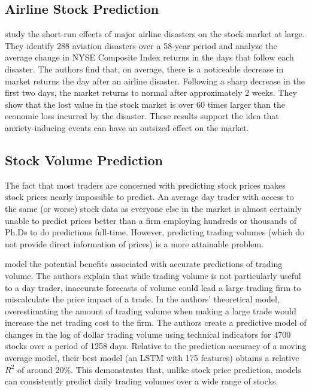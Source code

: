 \documentclass[12pt]{article}
\begin{document}
\subsection{Airline Stock Prediction}
\cite{kaplanski2010sentiment} study the short-run effects of major airline disasters on the stock market at large. They identify 288 aviation disasters over a 58-year period and analyze the average change in NYSE Composite Index returns in the days that follow each disaster. The authors find that, on average, there is a noticeable decrease in market returns the day after an airline disaster. Following a sharp decrease in the first two days, the market returns to normal after approximately 2 weeks. They show that the lost value in the stock market is over 60 times larger than the economic loss incurred by the disaster. These results support the idea that anxiety-inducing events can have an outsized effect on the market.

\subsection{Stock Volume Prediction}
The fact that most traders are concerned with predicting stock prices makes stock prices nearly impossible to predict. An average day trader with access to the same (or worse) stock data as everyone else in the market is almost certainly unable to predict prices better than a firm employing hundreds or thousands of Ph.Ds to do predictions full-time. However, predicting trading volumes (which do not provide direct information of prices) is a more attainable problem.

\cite{goyenko2024trading} model the potential benefits associated with accurate predictions of trading volume. The authors explain that while trading volume is not particularly useful to a day trader, inaccurate forecasts of volume could lead a large trading firm to miscalculate the price impact of a trade. In the authors' theoretical model, overestimating the amount of trading volume when making a large trade would increase the net trading cost to the firm. The authors create a predictive model of changes in the log of dollar trading volume using technical indicators for 4700 stocks over a period of 1258 days. Relative to the prediction accuracy of a moving average model, their best model (an LSTM with 175 features) obtains a relative $R^2$ of around 20\%. This demonstrates that, unlike stock price prediction, models can consistently predict daily trading volumes over a wide range of stocks.
\end{document}
